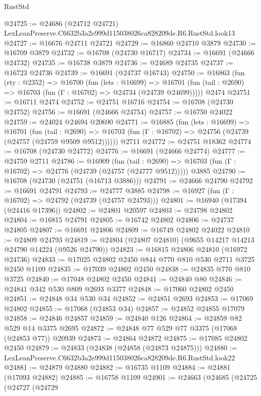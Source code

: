 \begin{lexlean}{RustStd}
\begin{coremodule}
@24725 := @24686 (@24712 @24721) LexLeanPreserve.C6632b3a2e999d115038026ca828209de.R6.RustStd.look13
@24727 := @16676 @24711 @24721
@24729 := @16860 @24710 @3879
@24730 := @16709 @3879
@24732 := @16708 (@24730 @16717)
@24734 := @16691 (@24666 @24732)
@24735 := @16738 @3879
@24736 := @24689 @24735
@24737 := @16723 @24736
@24739 := @16691 (@24737 @16743)
@24750 := @16863
    (fun (rty : @2352) =>
    @16700
      (fun (lets : @16699) =>
      @16701 (fun (tail : @2690) => @16703 (fun (Γ : @16702) => @24734 (@24739 @24699)))))
    @2474
@24751 := @16711 @2474
@24752 := @24751 @16716
@24754 := @16708 (@24730 @24752)
@24756 := @16691 (@24666 @24754)
@24757 := @16750 @24022
@24759 := @24024 @24694 @20690
@24771 := @16885
    (fun (lets : @16699) =>
    @16701
      (fun (tail : @2690) =>
      @16703 (fun (Γ : @16702) => @24756 (@24739 (@24757 (@24759 @9509 @9512))))))
    @2711
@24772 := @24751 @18362
@24774 := @16708 (@24730 @24772)
@24776 := @16691 (@24666 @24774)
@24777 := @24759 @2711
@24786 := @16909
    (fun (tail : @2690) => @16703 (fun (Γ : @16702) => @24776 (@24739 (@24757 (@24777 @9512)))))
    @3885
@24790 := @16708 (@24730 (@24751 (@16713 @3886)))
@24791 := @24666 @24790
@24792 := @16691 @24791
@24793 := @24777 @3885
@24798 := @16927 (fun (Γ : @16702) => @24792 (@24739 (@24757 @24793)))
@24801 := @16940 (@17394 (@24416 @17396))
@24802 := @24801 @20597
@24803 := @24798 @24802
@24804 := @16815 @24791
@24805 := @16742 @24802
@24806 := @24737 @24805
@24807 := @16691 @24806
@24809 := @16749 @24802 @24022
@24810 := @24809 @24793
@24819 := @24804 (@24807 @24810) (@9655 @14217 @14213 @24790 @14224 (@9526 @24790))
@24823 := @16815 @24806 @24810 (@16972 @24736)
@24833 := @17025 @24802 @2450 @844 @770 @810 @530 @2711 @3725 @2450 @1109
@24835 := @17039 @24802 @2450
@24838 := @24835 @770 @810 @3725
@24840 := @17048 @24802 @2450
@24841 := @24840 @80
@24846 := @24841 @342 @530 @809 @2693 @3377
@24848 := @17060 @24802 @2450
@24851 := @24848 @34 @530 @34
@24852 := @24851 @2693
@24853 := @17069 @24802
@24855 := @17068 (@24853 @34)
@24857 := @24852 @24855 @17079
@24858 := @24846 @24857
@24859 := @24840 @126
@24864 := @24859 @82 @529 @14 @3375 @2695
@24872 := @24848 @77 @529 @77 @3375 (@17068 (@24853 @77)) @20939
@24873 := @24864 @24872
@24875 := @17085 @24802 @2450
@24879 := @24833 (@24838 (@24858 (@24873 @24875)))
@24880 := LexLeanPreserve.C6632b3a2e999d115038026ca828209de.R6.RustStd.look22
@24881 := @24879 @24880
@24882 := @16735 @1109
@24884 := @24881 (@17093 @24882)
@24885 := @16758 @1109
@24901 := @24663
    (@24685
      (@24725
        (@24727
          (@24729

\end{coremodule}
\end{lexlean}
